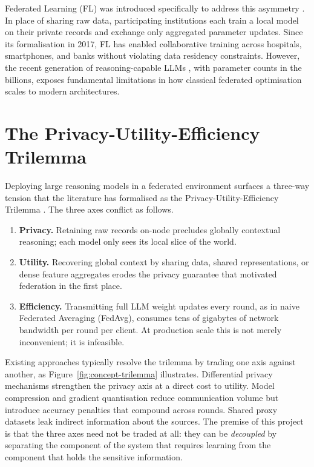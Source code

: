 \documentclass{report}
\begin{document}
Federated Learning (FL) was introduced specifically to address this asymmetry \cite{mcmahan2017communication}. In place of sharing raw data, participating institutions each train a local model on their private records and exchange only aggregated parameter updates. Since its formalisation in 2017, FL has enabled collaborative training across hospitals, smartphones, and banks without violating data residency constraints. However, the recent generation of reasoning-capable LLMs \cite{deepseek2025r1}, with parameter counts in the billions, exposes fundamental limitations in how classical federated optimisation scales to modern architectures.

\section{The Privacy-Utility-Efficiency Trilemma}

Deploying large reasoning models in a federated environment surfaces a three-way tension that the literature has formalised as the Privacy-Utility-Efficiency Trilemma \cite{plosone2023e0338822, allouah2023trilemma}. The three axes conflict as follows.

\begin{enumerate}
    \setlength\itemsep{0em}
    \item \textbf{Privacy.} Retaining raw records on-node precludes globally contextual reasoning; each model only sees its local slice of the world.
    \item \textbf{Utility.} Recovering global context by sharing data, shared representations, or dense feature aggregates erodes the privacy guarantee that motivated federation in the first place.
    \item \textbf{Efficiency.} Transmitting full LLM weight updates every round, as in naive Federated Averaging (FedAvg), consumes tens of gigabytes of network bandwidth per round per client. At production scale this is not merely inconvenient; it is infeasible.
\end{enumerate}

Existing approaches typically resolve the trilemma by trading one axis against another, as Figure~\ref{fig:concept-trilemma} illustrates. Differential privacy mechanisms strengthen the privacy axis at a direct cost to utility. Model compression and gradient quantisation reduce communication volume but introduce accuracy penalties that compound across rounds. Shared proxy datasets leak indirect information about the sources. The premise of this project is that the three axes need not be traded at all: they can be \textit{decoupled} by separating the component of the system that requires learning from the component that holds the sensitive information.
\end{document}
